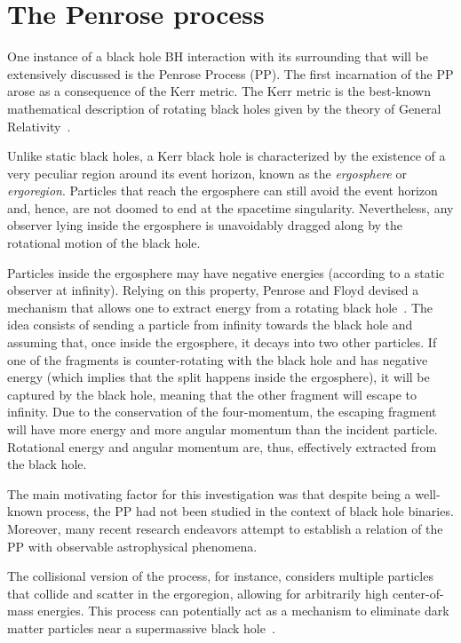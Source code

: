 \section{The Penrose process}

One instance of a black hole \ac{BH} interaction with its surrounding that will be extensively discussed is the Penrose Process (\ac{PP}). The first incarnation of the \ac{PP} arose as a consequence of the Kerr metric. The Kerr metric is the best-known mathematical description of rotating black holes given by the theory of General Relativity~\cite{Visser:2007fj,Bambi:2011mj,Teukolsky:2014vca,berti}.

Unlike static black holes, a Kerr black hole is characterized by the existence of a very peculiar region around its event horizon, known as the \emph{ergosphere} or \emph{ergoregion}. Particles that reach the ergosphere can still avoid the event horizon and, hence, are not doomed to end at the spacetime singularity. Nevertheless, any observer lying inside the ergosphere is unavoidably dragged along by the rotational motion of the black hole.

Particles inside the ergosphere may have negative energies (according to a static observer at infinity). Relying on this property, Penrose and Floyd devised a mechanism that allows one to extract energy from a rotating black hole~\cite{PENROSE1971}. The idea consists of sending a particle from infinity towards the black hole and assuming that, once inside the ergosphere, it decays into two other particles. If one of the fragments is counter-rotating with the black hole and has negative energy (which implies that the split happens inside the ergosphere), it will be captured by the black hole, meaning that the other fragment will escape to infinity. Due to the conservation of the four-momentum, the escaping fragment will have more energy and more angular momentum than the incident particle. Rotational energy and angular momentum are, thus, effectively extracted from the black hole.

The main motivating factor for this investigation was that despite being a well-known process, the \ac{PP} had not been studied in the context of black hole binaries. Moreover, many recent research endeavors attempt to establish a relation of the \ac{PP} with observable astrophysical phenomena.

The collisional version of the process, for instance, considers multiple particles that collide and scatter in the ergoregion, allowing for arbitrarily high center-of-mass energies. This process can potentially act as a mechanism to eliminate dark matter particles near a supermassive black hole~\cite{Schnittman:2018ccg}.

